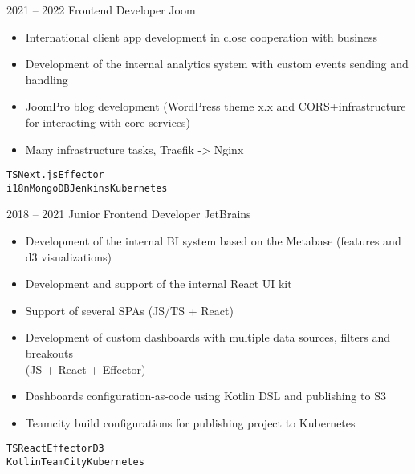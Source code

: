 \documentclass[9pt]{template}
\begin{document}
\begin{entrylist}
	\entry
	{2021 -- 2022}
	{Frontend Developer}
	{Joom}
	{
	        \begin{itemize}[noitemsep,topsep=5pt,leftmargin=8pt]
		        \item International client app development in close cooperation with business
		        \item Development of the internal analytics system with custom events sending and handling
			\item JoomPro blog development (WordPress theme x.x and CORS+infrastructure for interacting with core services)
		        \item Many infrastructure tasks, Traefik -> Nginx
		\end{itemize}
		\texttt{TS}\slashsep\texttt{Next.js}\slashsep\texttt{Effector}\\
		\texttt{i18n}\slashsep\texttt{MongoDB}\slashsep\texttt{Jenkins}\slashsep\texttt{Kubernetes}}
	\entry
	{2018 -- 2021}
	{Junior Frontend Developer}
	{JetBrains}
	{
	        \begin{itemize}[noitemsep,topsep=5pt,leftmargin=8pt]
		        \item Development of the internal BI system based on the Metabase (features and d3 visualizations)
		        \item Development and support of the internal React UI kit
		        \item Support of several SPAs (JS/TS + React)
		        \item Development of custom dashboards with multiple data sources, filters and breakouts\\ (JS + React + Effector)\\ 
		        \item Dashboards configuration-as-code using Kotlin DSL and publishing to S3
		        \item Teamcity build configurations for publishing project to Kubernetes
		\end{itemize}
		\texttt{TS}\slashsep\texttt{React}\slashsep\texttt{Effector}\slashsep\texttt{D3}\\
		\texttt{Kotlin}\slashsep\texttt{TeamCity}\slashsep\texttt{Kubernetes}}
\end{entrylist}
\end{document}

